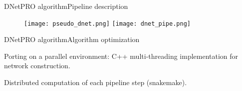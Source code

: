 \documentclass{standalone}
\begin{document}
\begin{frame}{DNetPRO algorithm}{Pipeline description}

  \begin{figure}
    \begin{overprint}
      \centering\texttt{[image: pseudo\_dnet.png]}
      \vspace{1cm}\centering\texttt{[image: dnet\_pipe.png]}
    \end{overprint}
  \end{figure}

\end{frame}


\begin{frame}{DNetPRO algorithm}{Algorithm optimization}

  Porting on a parallel environment: \textsf{C++} multi-threading implementation for network construction.

  Distributed computation of each pipeline step (\textsf{snakemake}).

  \begin{columns}

    \begin{column}{0.5\linewidth}

      \begin{figure}[htbp]
        \centering
        \def\svgwidth{0.8\linewidth}
        
      \end{figure}

    \end{column}

    \begin{column}{0.5\linewidth}

      \begin{figure}[htbp]
        \centering
        \def\svgwidth{0.8\linewidth}
        
      \end{figure}

    \end{column}

  \end{columns}

    \begin{figure}[htbp]
      \centering
      \def\svgwidth{0.5\linewidth}
      
    \end{figure}

\end{frame}
\end{document}
